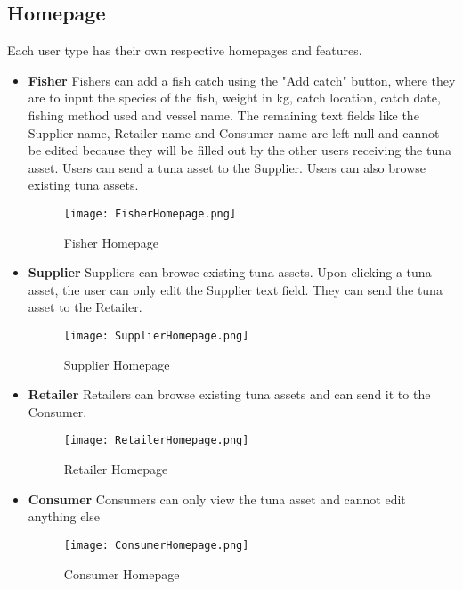 \subsection{Homepage}
Each user type has their own respective homepages and features.
	\begin{itemize}
		\item \textbf{Fisher}
		Fishers can add a fish catch using the "Add catch" button, where they are to input the species of the fish, weight in kg, catch location, catch date, fishing method used and vessel name. The remaining text fields like the Supplier name, Retailer name and Consumer name are left null and cannot be edited because they will be filled out by the other users receiving the tuna asset. Users can send a tuna asset to the Supplier. Users can also browse existing tuna assets. 
		
			\begin{figure}[H]
				\centering
				\texttt{[image: FisherHomepage.png]}
				\caption{Fisher Homepage}
				\label{fig:fisherhome_page}
			\end{figure}
			
		\item \textbf{Supplier}
		Suppliers can browse existing tuna assets. Upon clicking a tuna asset, the user can only edit the Supplier text field. They can send the tuna asset to the Retailer.
		
			\begin{figure}[H]
				\centering
				\texttt{[image: SupplierHomepage.png]}
				\caption{Supplier Homepage}
				\label{fig:supplierhome_page}
			\end{figure}
			
		\item \textbf{Retailer}
		Retailers can browse existing tuna assets and can send it to the Consumer.
		
		\begin{figure}[H]
			\centering
			\texttt{[image: RetailerHomepage.png]}
			\caption{Retailer Homepage}
			\label{fig:retailerhome_page}
		\end{figure}
		
		\item \textbf{Consumer}
		Consumers can only view the tuna asset and cannot edit anything else
		
		\begin{figure}[H]
			\centering
			\texttt{[image: ConsumerHomepage.png]}
			\caption{Consumer Homepage}
			\label{fig:consumerhome_page}
		\end{figure}
		
	\end{itemize}
	
